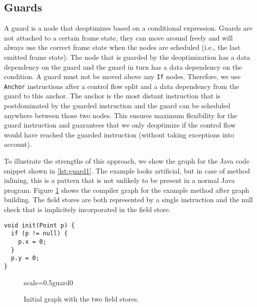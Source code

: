 \documentclass[twocolumn]{svjour3}
\begin{document}
\subsection{Guards}
A guard is a node that deoptimizes based on a conditional expression.
Guards are not attached to a certain frame state, they can move around freely and will always use the correct frame state when the nodes are scheduled (i.e., the last emitted frame state).
The node that is guarded by the deoptimization has a data dependency on the guard and the guard in turn has a data dependency on the condition.
A guard must not be moved above any \texttt{If} nodes.
Therefore, we use \texttt{Anchor} instructions after a control flow split and a data dependency from the guard to this anchor.
The anchor is the most distant instruction that is postdominated by the guarded instruction and the guard can be scheduled anywhere between those two nodes.
This ensures maximum flexibility for the guard instruction and guarantees that we only deoptimize if the control flow would have reached the guarded instruction (without taking exceptions into account).

To illustrate the strengths of this approach, we show the graph for the Java code snippet shown in \ref{lst:guard1}.
The example looks artificial, but in case of method inlining, this is a pattern that is not unlikely to be present in a normal Java program.
Figure \ref{fig:guard0} shows the compiler graph for the example method after graph building.
The field stores are both represented by a single instruction and the null check that is implicitely incorporated in the field store.

\begin{lstlisting}[label=lst:guard1, caption=Example method that demonstrates the strengths of modelling the guards explicitely., captionpos=b]
void init(Point p) {
  if (p != null) {
    p.x = 0;
  }
  p.y = 0;
}
\end{lstlisting}

\begin{figure}[ht]
  \centering
\begin{digraphenv}{scale=0.5}{guard0}
\end{digraphenv}
  \caption{Initial graph with the two field stores.}
  \label{fig:guard0}
\end{figure}
\end{document}
